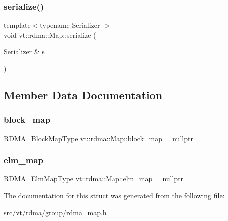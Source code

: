 \mbox{\label{structvt_1_1rdma_1_1_map_a303a71e8ea3386768be41e8bfe5c9e9a}} 
\subsubsection{\texorpdfstring{serialize()}{serialize()}}
{\footnotesize\ttfamily template$<$typename Serializer $>$ \\
void vt\+::rdma\+::\+Map\+::serialize (\begin{DoxyParamCaption}\item[{Serializer \&}]{s }\end{DoxyParamCaption})\hspace{0.3cm}{\ttfamily [inline]}}



\subsection{Member Data Documentation}
\mbox{\label{structvt_1_1rdma_1_1_map_a4c23ea8b0775c9598d818348e66b4976}} 
\subsubsection{\texorpdfstring{block\+\_\+map}{block\_map}}
{\footnotesize\ttfamily \hyperlink{namespacevt_1_1rdma_a049e294a5236ad30692253d5f82886c9}{R\+D\+M\+A\+\_\+\+Block\+Map\+Type} vt\+::rdma\+::\+Map\+::block\+\_\+map = nullptr}

\mbox{\label{structvt_1_1rdma_1_1_map_ab333842b2ae2f3efe15f1190bac32df2}} 
\subsubsection{\texorpdfstring{elm\+\_\+map}{elm\_map}}
{\footnotesize\ttfamily \hyperlink{namespacevt_1_1rdma_a6798ab36a5dcb8749c25dff719f9ce07}{R\+D\+M\+A\+\_\+\+Elm\+Map\+Type} vt\+::rdma\+::\+Map\+::elm\+\_\+map = nullptr}



The documentation for this struct was generated from the following file\+:\begin{DoxyCompactItemize}
\item 
src/vt/rdma/group/\hyperlink{rdma__map_8h}{rdma\+\_\+map.\+h}\end{DoxyCompactItemize}

